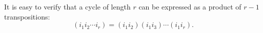 It is easy to verify that a cycle of length $r$ can be expressed as a product of $r-1$ transpositions:
$$(i_1 i_2 \cdots i_r) = (i_1 i_2)(i_1 i_3) \cdots (i_1 i_r).$$
